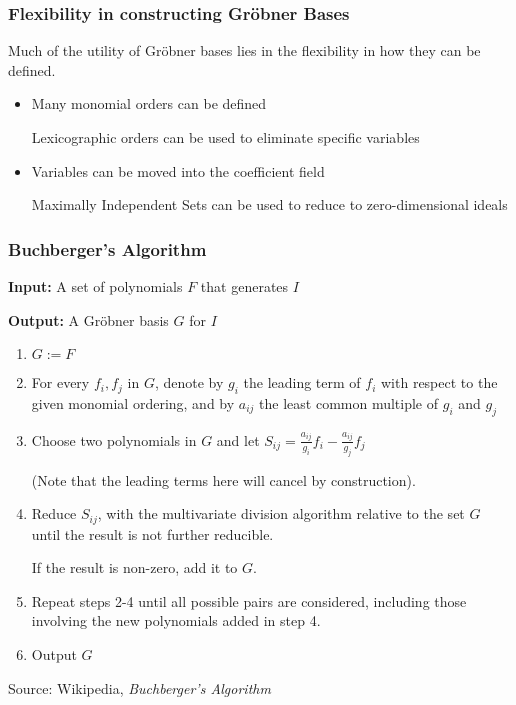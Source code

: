 \documentclass[11pt]{beamer}
\begin{document}
\begin{frame}
\frametitle{Flexibility in constructing Gr\"obner Bases}
Much of the utility of Gr\"obner bases lies in the flexibility in how they can be defined.
\begin{itemize}
\item Many monomial orders can be defined

Lexicographic orders can be used to eliminate specific variables

\vskip 12pt
\item Variables can be moved into the coefficient field

Maximally Independent Sets can be used to reduce to zero-dimensional ideals
\end{itemize}
\end{frame}

\begin{frame}
\frametitle{Buchberger's Algorithm}

{\bf Input:} A set of polynomials $F$ that generates $I$

{\bf Output:} A Gröbner basis $G$ for $I$

\begin{enumerate}
\item $G := F$
\item For every $f_i,f_j$ in $G$, denote by $g_i$ the leading term of $f_i$ with respect to the given monomial ordering,
and by $a_{ij}$ the least common multiple of $g_i$ and $g_j$
\item Choose two polynomials in $G$ and let $S_{ij}=\frac{a_{ij}}{g_i}f_i  - \frac{a_{ij}}{g_j}f_j $

(Note that the leading terms here will cancel by construction).
\item Reduce $S_{ij}$, with the multivariate division algorithm relative to the set $G$ until the result is not further reducible.

If the result is non-zero, add it to $G$.
\item Repeat steps 2-4 until all possible pairs are considered, including those involving the new polynomials added in step 4.
\item Output $G$
\end{enumerate}

Source: Wikipedia, {\it Buchberger's Algorithm}
\end{frame}
\end{document}
